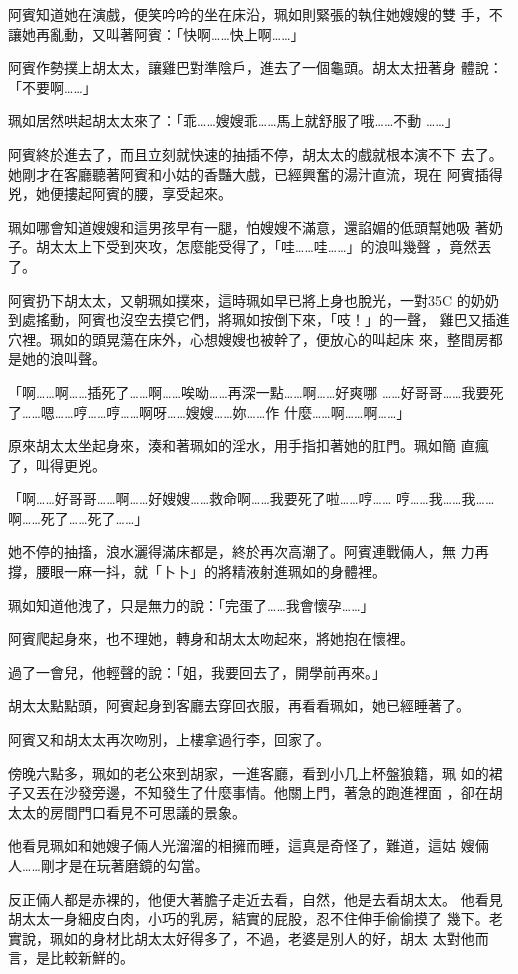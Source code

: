 阿賓知道她在演戲，便笑吟吟的坐在床沿，珮如則緊張的執住她嫂嫂的雙
手，不讓她再亂動，又叫著阿賓：「快啊……快上啊……」

阿賓作勢撲上胡太太，讓雞巴對準陰戶，進去了一個龜頭。胡太太扭著身
體說：「不要啊……」

珮如居然哄起胡太太來了：「乖……嫂嫂乖……馬上就舒服了哦……不動
……」

阿賓終於進去了，而且立刻就快速的抽插不停，胡太太的戲就根本演不下
去了。她剛才在客廳聽著阿賓和小姑的香豔大戲，已經興奮的湯汁直流，現在
阿賓插得兇，她便摟起阿賓的腰，享受起來。

珮如哪會知道嫂嫂和這男孩早有一腿，怕嫂嫂不滿意，還諂媚的低頭幫她吸
著奶子。胡太太上下受到夾攻，怎麼能受得了，「哇……哇……」的浪叫幾聲
，竟然丟了。

阿賓扔下胡太太，又朝珮如撲來，這時珮如早已將上身也脫光，一對35C
的奶奶到處搖動，阿賓也沒空去摸它們，將珮如按倒下來，「吱！」的一聲，
雞巴又插進穴裡。珮如的頭晃蕩在床外，心想嫂嫂也被幹了，便放心的叫起床
來，整間房都是她的浪叫聲。

「啊……啊……插死了……啊……唉呦……再深一點……啊……好爽哪
……好哥哥……我要死了……嗯……哼……哼……啊呀……嫂嫂……妳……作
什麼……啊……啊……」

原來胡太太坐起身來，湊和著珮如的淫水，用手指扣著她的肛門。珮如簡
直瘋了，叫得更兇。

「啊……好哥哥……啊……好嫂嫂……救命啊……我要死了啦……哼……
哼……我……我……啊……死了……死了……」

她不停的抽搐，浪水灑得滿床都是，終於再次高潮了。阿賓連戰倆人，無
力再撐，腰眼一麻一抖，就「卜卜」的將精液射進珮如的身體裡。

珮如知道他洩了，只是無力的說：「完蛋了……我會懷孕……」

阿賓爬起身來，也不理她，轉身和胡太太吻起來，將她抱在懷裡。

過了一會兒，他輕聲的說：「姐，我要回去了，開學前再來。」

胡太太點點頭，阿賓起身到客廳去穿回衣服，再看看珮如，她已經睡著了。

阿賓又和胡太太再次吻別，上樓拿過行李，回家了。

傍晚六點多，珮如的老公來到胡家，一進客廳，看到小几上杯盤狼籍，珮
如的裙子又丟在沙發旁邊，不知發生了什麼事情。他關上門，著急的跑進裡面
，卻在胡太太的房間門口看見不可思議的景象。

他看見珮如和她嫂子倆人光溜溜的相擁而睡，這真是奇怪了，難道，這姑
嫂倆人……剛才是在玩著磨鏡的勾當。

反正倆人都是赤裸的，他便大著膽子走近去看，自然，他是去看胡太太。
他看見胡太太一身細皮白肉，小巧的乳房，結實的屁股，忍不住伸手偷偷摸了
幾下。老實說，珮如的身材比胡太太好得多了，不過，老婆是別人的好，胡太
太對他而言，是比較新鮮的。

